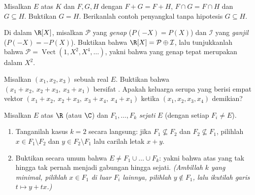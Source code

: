 \begin{exercise}[$\star\star\star$]\label{exo:b1:vspaces:9}
Misalkan $E$  atas $K$ dan $F, G, H$  dengan $F + G =
F + H$, $F \cap G = F \cap H$ dan $G \subseteq H$. Buktikan $G = H$.
Berikanlah contoh penyangkal tanpa hipotesis $G \subseteq H$.
\end{exercise}

\begin{exercise}[$\star\star$]\label{exo:b1:vspaces:10}
Di dalam $\R[X]$, misalkan $\mathcal P$   yang \emph{genap}
($P(-X) = P(X)$) dan $\mathcal I$  yang \emph{ganjil}
($P(-X) = -P(X)$). Buktikan bahwa $\R[X] = \mathcal P \oplus \mathcal
I$, lalu tunjukkanlah bahwa $\mathcal P =
\operatorname{Vect}(1, X^2, X^4, \dots)$, yakni bahwa 
yang genap tepat merupakan  dalam $X^2$.
\end{exercise}

\begin{exercise}[$\star\star$]\label{exo:b1:vspaces:11}
Misalkan $(x_1, x_2, x_3)$  sebuah  real $E$.
Buktikan bahwa $(x_1 + x_2,\ x_2 + x_3,\ x_3 + x_1)$ bersifat . Apakah
keluarga serupa yang berisi empat vektor $(x_1 + x_2,\ x_2 + x_3,\ x_3 +
x_4,\ x_4 + x_1)$  ketika $(x_1, x_2, x_3, x_4)$ demikian?
\end{exercise}

\begin{exercise}[$\star\star\star$]\label{exo:b1:vspaces:12}
Misalkan $E$  atas $\R$ (atau $\C$) dan $F_1, \dots,
F_k$  \emph{sejati} $E$ (dengan setiap $F_i \neq E$).
\begin{enumerate}
  \item Tanganilah kasus $k = 2$ secara langsung: jika $F_1 \not\subseteq
        F_2$ dan $F_2 \not\subseteq F_1$, pilihlah $x \in F_1
        \setminus F_2$ dan $y \in F_2 \setminus F_1$ lalu carilah letak $x
        + y$.
  \item Buktikan secara umum bahwa $E \neq F_1 \cup \dots \cup F_k$: yakni bahwa
         atas  yang tak hingga tak pernah menjadi gabungan
        hingga  sejati. \emph{(Ambillah $k$ yang minimal, pilihlah
        $x \in F_1$ di luar $F_i$ lainnya, pilihlah $y \notin F_1$,
        lalu ikutilah garis $t \mapsto y + tx$.)}
\end{enumerate}
\end{exercise}


